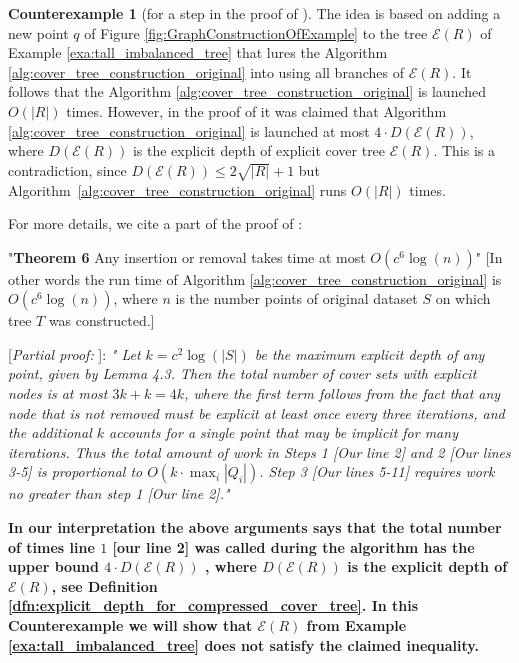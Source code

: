\documentclass{vgtc}                          %
\numberwithin{algocf}{section}
\theoremstyle{definition}
\theoremstyle{definition}
\theoremstyle{definition}
\newtheorem{cexa}[algocf]{Counterexample}
\theoremstyle{plain}
\newcommand{\T}{\mathcal{E}}
\begin{document}
\begin{cexa}[for a step in the proof of {\cite[Theorem~6]{beygelzimer2006cover}}]
	\label{cexa:construction_algorithm_of_original_cover_tree}
The idea is based on adding a new point $q$ of Figure \ref{fig:GraphConstructionOfExample} to the tree $\T(R)$ of Example \ref{exa:tall_imbalanced_tree} that lures the Algorithm \ref{alg:cover_tree_construction_original} into using all branches of $\T(R)$. It follows that the Algorithm \ref{alg:cover_tree_construction_original} is launched $O(|R|)$ times. However, in the proof of \cite[Theorem~6]{beygelzimer2006cover} it was claimed that Algorithm \ref{alg:cover_tree_construction_original} is
	launched at most $4 \cdot D(\T(R))$, where $D(\T(R))$ is the explicit depth of explicit cover tree $\T(R)$.
	This is a contradiction, since $D(\T(R)) \leq 2\sqrt{|R|} + 1$ but Algorithm~\ref{alg:cover_tree_construction_original} runs $O(|R|)$ times.
	\medskip
	
    \noindent
	For more details, we cite a part of the proof of \cite[Theorem~6]{beygelzimer2006cover}:
	
	\medskip
	
	"\textbf{Theorem 6} Any insertion or removal takes time at most $O(c^6\log(n))$"
	[In other words the run time of Algorithm \ref{alg:cover_tree_construction_original} is $O(c^6\log(n))$, where $n$ is the number points of original dataset $S$ on which tree $T$ was constructed.]
	
	[\emph{Partial proof:} ]: \emph{" Let $k = c^2 \log(|S|)$ be the maximum explicit depth
	of any point, given by Lemma 4.3. Then the total
	number of cover sets with explicit nodes is at most
	$3k+k = 4 k$, where the first term follows from the fact
	that any node that is not removed must be explicit at
	least once every three iterations, and the additional
	$k$ accounts for a single point that may be implicit for
	many iterations.
	Thus the total amount of work in Steps 1 [Our line 2] and 2 [Our lines 3-5] is
	proportional to $O(k \cdot \max_i|Q_i|)$. Step 3 [Our lines 5-11] requires work
	no greater than step 1 [Our line 2]."}
	
	\medskip
	\noindent
	\textbf{In our interpretation the above arguments says that the total number of times line $1$ [our line 2] was called during the algorithm has the upper bound $4 \cdot D(\T(R))$ , where $D(\T(R))$ is the explicit depth of $\T(R)$, see Definition \ref{dfn:explicit_depth_for_compressed_cover_tree}. In this Counterexample we will show that $\T(R)$ from Example \ref{exa:tall_imbalanced_tree} does not satisfy the claimed inequality.}


\end{cexa}
\end{document}

